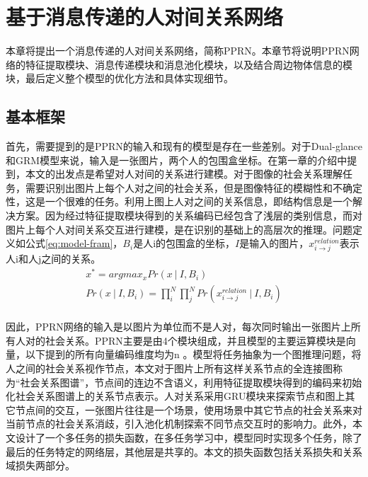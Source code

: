 
\chapter{基于消息传递的人对间关系网络}
\label{ch:model}

本章将提出一个消息传递的人对间关系网络，简称PPRN。本章节将说明PPRN网络的特征提取模块、消息传递模块和消息池化模块，以及结合周边物体信息的模块，最后定义整个模型的优化方法和具体实现细节。


\section{基本框架}
首先，需要提到的是PPRN的输入和现有的模型是存在一些差别。对于Dual-glance和GRM模型来说，输入是一张图片，两个人的包围盒坐标。在第一章的介绍中提到，本文的出发点是希望对人对间的关系进行建模。对于图像的社会关系理解任务，需要识别出图片上每个人对之间的社会关系，但是图像特征的模糊性和不确定性，这是一个很难的任务。利用上图上人对之间的关系信息，即结构信息是一个解决方案。因为经过特征提取模块得到的关系编码已经包含了浅层的类别信息，而对图片上每个人对间关系交互进行建模，是在识别的基础上的高层次的推理。问题定义如公式\ref{eq:model-fram}，$B_{i}$是人i的包围盒的坐标，$I$是输入的图片，$x_{i \rightarrow j}^{relation}$表示人i和人j之间的关系。
\begin{equation} \label{eq:model-fram}
\begin{split}
    x^{*} = argmax_{x}Pr(x~|~I,B_{i}) \\
    Pr(x~|~I,B_{i}) = \prod_{i}^{N}\prod_{j}^{N}Pr(x_{i \rightarrow j}^{relation}~|~I,B_{i}) \\
\end{split}
\end{equation}

因此，PPRN网络的输入是以图片为单位而不是人对，每次同时输出一张图片上所有人对的社会关系。PPRN主要是由4个模块组成，并且模型的主要运算模块是向量，以下提到的所有向量编码维度均为n 。模型将任务抽象为一个图推理问题，将人之间的社会关系视作节点，本文对于图片上所有这样关系节点的全连接图称为``社会关系图谱''，节点间的连边不含语义，利用特征提取模块得到的编码来初始化社会关系图谱上的关系节点表示。人对关系采用GRU模块来探索节点和图上其它节点间的交互，一张图片往往是一个场景，使用场景中其它节点的社会关系来对当前节点的社会关系消歧，引入池化机制探索不同节点交互时的影响力。此外，本文设计了一个多任务的损失函数，在多任务学习中，模型同时实现多个任务，除了最后的任务特定的网络层，其他层是共享的。本文的损失函数包括关系损失和关系域损失两部分。

